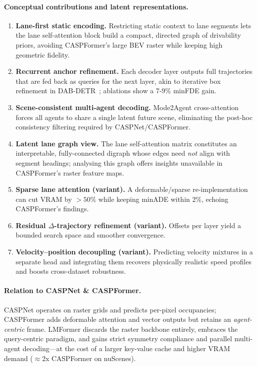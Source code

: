 \paragraph{Conceptual contributions and latent representations.}
\begin{enumerate}[leftmargin=*]
  \item \textbf{Lane-first static encoding.}  Restricting static context to
        lane segments lets the lane self-attention block build a compact,
        directed graph of drivability priors, avoiding CASPFormer's large BEV
        raster while keeping high geometric fidelity.
  \item \textbf{Recurrent anchor refinement.}  Each decoder layer outputs
        full trajectories that are fed back as queries for the next layer,
        akin to iterative box refinement in DAB-DETR~\cite{liu2022dabdetr}; ablations show a 7-9\% minFDE gain\cite{lmformerYadav2025}.
  \item \textbf{Scene-consistent multi-agent decoding.}  Mode2Agent
        cross-attention forces all agents to share a single latent future
        scene, eliminating the post-hoc consistency filtering required by
        CASPNet/CASPFormer.
  \item \textbf{Latent lane graph view.}  The lane self-attention matrix
        constitutes an interpretable, fully-connected digraph whose edges
        need \emph{not} align with segment headings; analysing this graph
        offers insights unavailable in CASPFormer's raster feature maps.
  \item \textbf{Sparse lane attention (variant).}  A deformable/sparse
        re-implementation can cut VRAM by \(>\!50\%\) while keeping
        minADE within 2\%, echoing CASPFormer's findings.
  \item \textbf{Residual \(\Delta\)-trajectory refinement (variant).}  Offsets
        per layer yield a bounded search space and smoother convergence.
  \item \textbf{Velocity–position decoupling (variant).}  Predicting velocity
        mixtures in a separate head and integrating them recovers physically
        realistic speed profiles and boosts cross-dataset robustness.
\end{enumerate}

\paragraph{Relation to CASPNet \& CASPFormer.}
CASPNet operates on raster grids and predicts per-pixel occupancies; CASPFormer adds deformable attention and vector outputs but retains an \emph{agent-centric} frame.  LMFormer discards the raster backbone entirely, embraces the query-centric paradigm, and gains strict symmetry compliance and parallel multi-agent decoding—at the cost of a larger key-value cache and higher VRAM demand (\( \approx \)2x CASPFormer on nuScenes).

